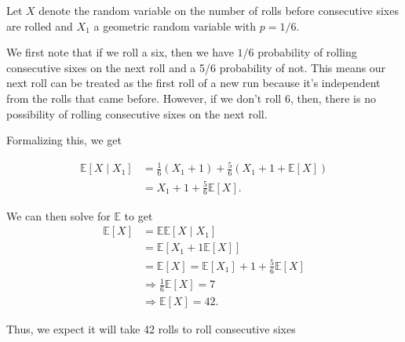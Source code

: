 \documentclass[letterpaper, 12pt]{article}
\begin{document}
	Let $X$ denote the random variable on the number of rolls before consecutive sixes are rolled and $X_1$ a geometric random variable with $p=1/6$.

	We first note that if we roll a six, then we have $1/6$ probability of rolling consecutive sixes on the next roll and a 5/6 probability of not. This means our next roll can be treated as the first roll of a new run because it's independent from the rolls that came before. However, if we don't roll 6, then, there is no possibility of rolling consecutive sixes on the next roll.

	Formalizing this, we get

	\begin{align*}
		\mathbb{E}[X\mid X_1] &= \frac{1}{6}(X_1 + 1) + \frac{5}{6}(X_1 + 1 + \mathbb{E}[X]) \\
		&= X_1 + 1 +\frac{5}{6}\mathbb{E}[X].
	\end{align*}

	We can then solve for $\mathbb{E}$ to get
	\begin{align*}
		\mathbb{E}[X] &= \mathbb{E} \mathbb{E} [X \mid X_1] \\
		&= \mathbb{E}[X_1 + 1 \mathbb{E}[X]] \\
		&= \mathbb{E}[X] = \mathbb{E}[X_1] + 1 + \frac{5}{6}\mathbb{E}[X] \\
		&\Rightarrow \frac{1}{6}\mathbb{E}[X] = 7 \\
		&\Rightarrow \mathbb{E}[X] = 42.
	\end{align*}
	
	Thus, we expect it will take 42 rolls to roll consecutive sixes
	
\end{document}
